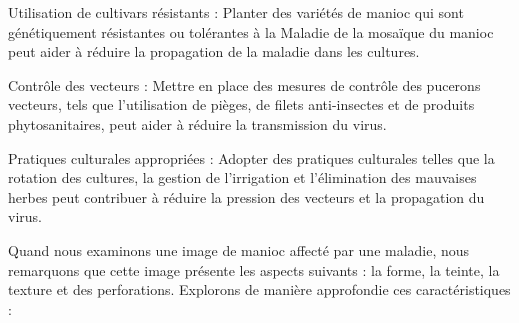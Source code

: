 \documentclass{article}
\begin{document}
\begin{itemize}
			\textemdash  Utilisation de cultivars résistants : Planter des variétés de manioc qui sont génétiquement résistantes ou tolérantes à la Maladie de la mosaïque du manioc peut aider à réduire la propagation de la maladie dans les cultures.
			
			\textemdash  Contrôle des vecteurs : Mettre en place des mesures de contrôle des pucerons vecteurs, tels que l'utilisation de pièges, de filets anti-insectes et de produits phytosanitaires, peut aider à réduire la transmission du virus.
			
			\textemdash  Pratiques culturales appropriées : Adopter des pratiques culturales telles que la rotation des cultures, la gestion de l'irrigation et l'élimination des mauvaises herbes peut contribuer à réduire la pression des vecteurs et la propagation du virus.
		\end{itemize}
		
		Quand nous examinons une image de manioc affecté par une maladie, nous remarquons que cette image présente les aspects suivants : la forme, la teinte, la texture et des perforations.
		Explorons de manière approfondie ces caractéristiques :
		
\end{document}
